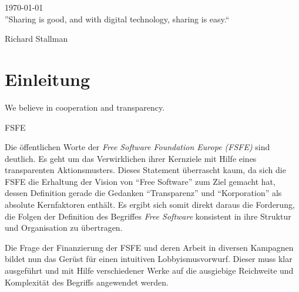 \begin{titlepage}

{\large \today}\\[3cm] %
\newpage
''Sharing is good, and with digital technology, sharing is easy.``

Richard Stallman






\vfill %



\end{titlepage}

\newcommand{\zB}{z.\,B. }
\newcommand{\ua}{u.\,a. }

\tableofcontents
\newpage

\section{Einleitung}
\epigraph{We believe in cooperation and transparency.}{FSFE}
Die öffentlichen Worte der \emph{Free Software Foundation Europe (FSFE)} sind 
deutlich. 
Es geht
um das Verwirklichen ihrer Kernziele mit Hilfe eines transparenten 
Aktionsmusters.
Dieses Statement überrascht kaum, da sich die FSFE die Erhaltung der Vision von 
``Free Software'' zum Ziel gemacht hat, dessen Definition gerade die Gedanken 
``Transparenz'' und ``Korporation'' als absolute Kernfaktoren enthält. Es ergibt 
sich somit direkt daraus die Forderung, die Folgen der Definition des 
Begriffes \emph{Free Software}
konsistent in ihre Struktur und Organisation zu übertragen.

Die Frage der Finanzierung der FSFE und deren Arbeit in diversen
Kampagnen bildet nun das Gerüst für einen intuitiven Lobbyismusvorwurf. Dieser 
muss klar ausgeführt und mit Hilfe
verschiedener Werke auf die ausgiebige Reichweite und Komplexität
des Begriffs angewendet werden.

